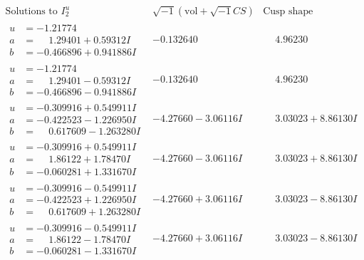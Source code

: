 \documentclass[1p]{elsarticle_modified}
\theoremstyle{definition}
\newcommand{\I}{\sqrt{-1}}
\begin{document}
$$\begin{array}{c|c|c}  
\text{Solutions to }I^u_{2}& \I (\text{vol} + \sqrt{-1}CS) & \text{Cusp shape}\\
 \hline 
\begin{aligned}
u &= -1.21774\phantom{ +0.000000I} \\
a &= \phantom{-}1.29401 + 0.59312 I \\
b &= -0.466896 + 0.941886 I\end{aligned}
 & -0.132640\phantom{ +0.000000I} & \phantom{-}4.96230\phantom{ +0.000000I} \\ \hline\begin{aligned}
u &= -1.21774\phantom{ +0.000000I} \\
a &= \phantom{-}1.29401 - 0.59312 I \\
b &= -0.466896 - 0.941886 I\end{aligned}
 & -0.132640\phantom{ +0.000000I} & \phantom{-}4.96230\phantom{ +0.000000I} \\ \hline\begin{aligned}
u &= -0.309916 + 0.549911 I \\
a &= -0.422523 - 1.226950 I \\
b &= \phantom{-}0.617609 - 1.263280 I\end{aligned}
 & -4.27660 - 3.06116 I & \phantom{-}3.03023 + 8.86130 I \\ \hline\begin{aligned}
u &= -0.309916 + 0.549911 I \\
a &= \phantom{-}1.86122 + 1.78470 I \\
b &= -0.060281 + 1.331670 I\end{aligned}
 & -4.27660 - 3.06116 I & \phantom{-}3.03023 + 8.86130 I \\ \hline\begin{aligned}
u &= -0.309916 - 0.549911 I \\
a &= -0.422523 + 1.226950 I \\
b &= \phantom{-}0.617609 + 1.263280 I\end{aligned}
 & -4.27660 + 3.06116 I & \phantom{-}3.03023 - 8.86130 I \\ \hline\begin{aligned}
u &= -0.309916 - 0.549911 I \\
a &= \phantom{-}1.86122 - 1.78470 I \\
b &= -0.060281 - 1.331670 I\end{aligned}
 & -4.27660 + 3.06116 I & \phantom{-}3.03023 - 8.86130 I \\ \hline\begin{aligned}

\end{aligned}
\end{array}$$
\end{document}
